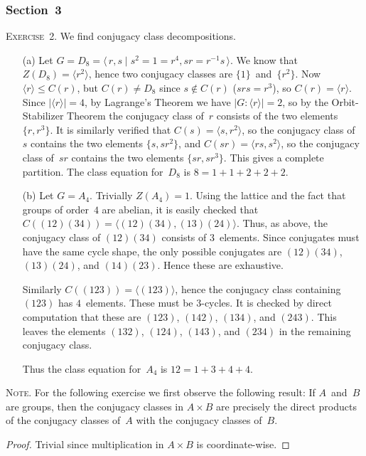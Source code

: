 \documentclass[letterpaper]{article}
\newcommand{\exercise}[1]{\goodbreak\noindent\textsc{Exercise~{#1}.}}
\newcommand{\note}{\goodbreak\noindent\textsc{Note.}}
\newcommand{\subgroup}{\le}
\newcommand{\ord}[1]{|{#1}|}
\newcommand{\gen}[1]{\langle{#1}\rangle}
\newcommand{\gindex}[2]{|{#1}:{#2}|}
\begin{document}
\subsubsection*{Section~3}
\exercise{2}
We find conjugacy class decompositions.
\begin{enumerate}[itemsep=0pt]
\item[(a)] Let $G=D_8=\gen{\,r,s\mid s^2=1=r^4, sr=r^{-1}s\,}$. We know that $Z(D_8)=\gen{r^2}$, hence two conjugacy classes are $\{1\}$~and~$\{r^2\}$. Now $\gen{r}\subgroup C(r)$, but $C(r)\ne D_8$ since $s\not\in C(r)$ ($srs=r^3$), so $C(r)=\gen{r}$. Since $\ord{\gen{r}}=4$, by Lagrange's Theorem we have $\gindex{G}{\gen{r}}=2$, so by the Orbit-Stabilizer Theorem the conjugacy class of~$r$ consists of the two elements $\{r,r^3\}$. It is similarly verified that $C(s)=\gen{s,r^2}$, so the conjugacy class of~$s$ contains the two elements $\{s, sr^2\}$, and $C(sr)=\gen{rs,s^2}$, so the conjugacy class of~$sr$ contains the two elements $\{sr,sr^3\}$. This gives a complete partition. The class equation for~$D_8$ is $8=1+1+2+2+2$.
\item[(b)] Let $G=A_4$. Trivially $Z(A_4)=1$. Using the lattice and the fact that groups of order~$4$ are abelian, it is easily checked that $C((12)(34))=\gen{(12)(34),(13)(24)}$. Thus, as above, the conjugacy class of $(12)(34)$ consists of $3$~elements. Since conjugates must have the same cycle shape, the only possible conjugates are $(12)(34)$, $(13)(24)$, and $(14)(23)$. Hence these are exhaustive.

Similarly $C((123))=\gen{(123)}$, hence the conjugacy class containing~$(123)$ has $4$~elements. These must be $3$-cycles. It is checked by direct computation that these are $(123)$, $(142)$, $(134)$, and $(243)$. This leaves the elements $(132)$, $(124)$, $(143)$, and $(234)$ in the remaining conjugacy class.

Thus the class equation for~$A_4$ is $12=1+3+4+4$.
\end{enumerate}

\note
For the following exercise we first observe the following result: If $A$~and~$B$ are groups, then the conjugacy classes in $A\times B$ are precisely the direct products of the conjugacy classes of~$A$ with the conjugacy classes of~$B$.
\begin{proof}
Trivial since multiplication in $A\times B$ is coordinate-wise.
\end{proof}
\end{document}
